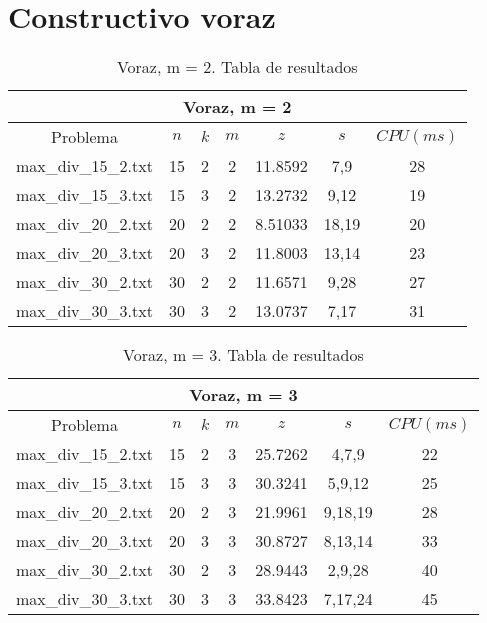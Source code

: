\section{Constructivo voraz}



   \begin{table}[h]
   {\small
   \begin{center}
   \begin{tabular}{ccccccc}
      \multicolumn{7}{c}{Voraz, m = 2} \\
      \hline
      Problema & $n$ & $k$ & $m$ & $z$ & $s$ & $CPU(ms)$ \\
      \hline
      max\_div\_15\_2.txt & 15 & 2 & 2 & 11.8592 & 7,9 & 28 \\
      max\_div\_15\_3.txt & 15 & 3 & 2 & 13.2732 & 9,12 & 19 \\
      max\_div\_20\_2.txt & 20 & 2 & 2 & 8.51033 & 18,19 & 20 \\
      max\_div\_20\_3.txt & 20 & 3 & 2 & 11.8003 & 13,14 & 23 \\
      max\_div\_30\_2.txt & 30 & 2 & 2 & 11.6571 & 9,28 & 27 \\
      max\_div\_30\_3.txt & 30 & 3 & 2 & 13.0737 & 7,17 & 31 \\
      \hline
   \end{tabular}
   \end{center}
   }
   \caption{Voraz, m = 2. Tabla de resultados}
   \end{table}

   \begin{table}[h]
   {\small
   \begin{center}
   \begin{tabular}{ccccccc}
      \multicolumn{7}{c}{Voraz, m = 3} \\
      \hline
      Problema & $n$ & $k$ & $m$ & $z$ & $s$ & $CPU(ms)$ \\
      \hline
      max\_div\_15\_2.txt & 15 & 2 & 3 & 25.7262 & 4,7,9 & 22 \\
      max\_div\_15\_3.txt & 15 & 3 & 3 & 30.3241 & 5,9,12 & 25 \\
      max\_div\_20\_2.txt & 20 & 2 & 3 & 21.9961 & 9,18,19 & 28 \\
      max\_div\_20\_3.txt & 20 & 3 & 3 & 30.8727 & 8,13,14 & 33 \\
      max\_div\_30\_2.txt & 30 & 2 & 3 & 28.9443 & 2,9,28 & 40 \\
      max\_div\_30\_3.txt & 30 & 3 & 3 & 33.8423 & 7,17,24 & 45 \\
      \hline
   \end{tabular}
   \end{center}
   }
   \caption{Voraz, m = 3. Tabla de resultados}
   \end{table}

